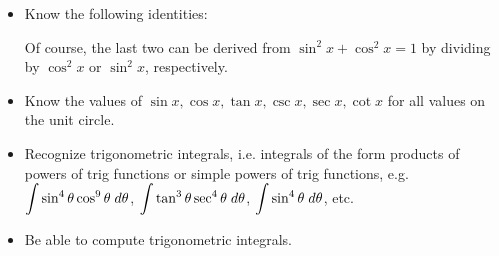 \documentclass[11pt,letterpaper]{article}
\begin{document}
\begin{itemize}
\item Know the following identities: 
Of course, the last two can be derived from $\sin^2 x + \cos^2 x= 1$ by dividing by $\cos^2 x$ or $\sin^2 x$, respectively. 

\item Know the values of $\sin x, \cos x, \tan x, \csc x, \sec x, \cot x$ for all values on the unit circle. 

\item Recognize trigonometric integrals, i.e. integrals of the form products of powers of trig functions or simple powers of trig functions, e.g. $\displaystyle\int \sin^4 \theta \cos^9 \theta \;d\theta$, $\displaystyle\int \tan^3 \theta \sec^4 \theta \;d\theta$, $\displaystyle\int \sin^4 \theta \;d\theta$, etc. 

\item Be able to compute trigonometric integrals.


\end{itemize}
\end{document}
